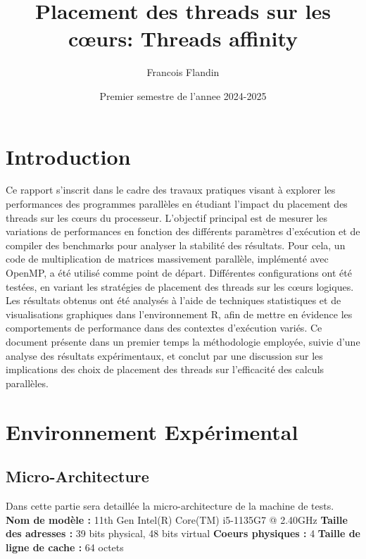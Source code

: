 \documentclass{rapport}
\title{Placement des threads sur les cœurs: Threads affinity}
\author{Francois Flandin}
\date{Premier semestre de l'annee 2024-2025}
\begin{document}
\maketitle

\clearpage
\tableofcontents

\clearpage


\section{Introduction}
Ce rapport s'inscrit dans le cadre des travaux pratiques visant à explorer les performances des programmes parallèles en étudiant l'impact du placement des threads sur les cœurs du processeur. L'objectif principal est de mesurer les variations de performances en fonction des différents paramètres d'exécution et de compiler des benchmarks pour analyser la stabilité des résultats.
\newline
Pour cela, un code de multiplication de matrices massivement parallèle, implémenté avec OpenMP, a été utilisé comme point de départ. Différentes configurations ont été testées, en variant les stratégies de placement des threads sur les cœurs logiques. Les résultats obtenus ont été analysés à l'aide de techniques statistiques et de visualisations graphiques dans l'environnement R, afin de mettre en évidence les comportements de performance dans des contextes d'exécution variés.
\newline
Ce document présente dans un premier temps la méthodologie employée, suivie d'une analyse des résultats expérimentaux, et conclut par une discussion sur les implications des choix de placement des threads sur l'efficacité des calculs parallèles.

\section*{Environnement Expérimental}
    \subsection*{Micro-Architecture}
    Dans cette partie sera detaillée la micro-architecture de la machine de tests.
    \newline\newline
    \textbf{Nom de modèle :} 11th Gen Intel(R) Core(TM) i5-1135G7 @ 2.40GHz
    \newline
    \textbf{Taille des adresses :} 39 bits physical, 48 bits virtual
    \newline
    \textbf{Coeurs physiques :} 4
    \newline
    \textbf{Taille de ligne de cache :} 64 octets
\end{document}
